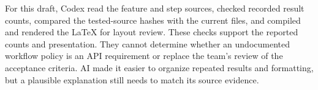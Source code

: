 For this draft, Codex read the feature and step sources, checked recorded result
counts, compared the tested-source hashes with the current files, and compiled
and rendered the LaTeX for layout review. These checks support the reported
counts and presentation. They cannot determine whether an undocumented workflow
policy is an API requirement or replace the team's review of the acceptance
criteria. AI made it easier to organize repeated results and formatting, but a
plausible explanation still needs to match its source evidence.

